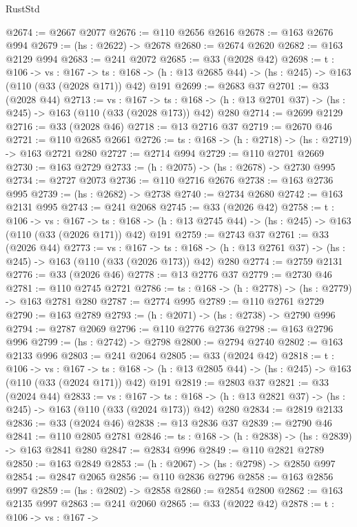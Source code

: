 \begin{lexlean}{RustStd}
\begin{coremodule}
@2674 := @2667 @2077
@2676 := @110 @2656 @2616
@2678 := @163 @2676 @994
@2679 := (hs : @2622) -> @2678
@2680 := @2674 @2620
@2682 := @163 @2129 @994
@2683 := @241 @2072
@2685 := @33 (@2028 @42)
@2698 := {t : @106} ->
  {vs : @167} ->
  {ts : @168} -> (h : @13 @2685 @44) -> (hs : @245) -> @163 (@110 (@33 (@2028 @171)) @42) @191
@2699 := @2683 @37
@2701 := @33 (@2028 @44)
@2713 := {vs : @167} ->
  {ts : @168} -> (h : @13 @2701 @37) -> (hs : @245) -> @163 (@110 (@33 (@2028 @173)) @42) @280
@2714 := @2699 @2129
@2716 := @33 (@2028 @46)
@2718 := @13 @2716 @37
@2719 := @2670 @46
@2721 := @110 @2685 @2661
@2726 := {ts : @168} -> (h : @2718) -> (hs : @2719) -> @163 @2721 @280
@2727 := @2714 @994
@2729 := @110 @2701 @2669
@2730 := @163 @2729
@2733 := (h : @2075) -> (hs : @2678) -> @2730 @995
@2734 := @2727 @2073
@2736 := @110 @2716 @2676
@2738 := @163 @2736 @995
@2739 := (hs : @2682) -> @2738
@2740 := @2734 @2680
@2742 := @163 @2131 @995
@2743 := @241 @2068
@2745 := @33 (@2026 @42)
@2758 := {t : @106} ->
  {vs : @167} ->
  {ts : @168} -> (h : @13 @2745 @44) -> (hs : @245) -> @163 (@110 (@33 (@2026 @171)) @42) @191
@2759 := @2743 @37
@2761 := @33 (@2026 @44)
@2773 := {vs : @167} ->
  {ts : @168} -> (h : @13 @2761 @37) -> (hs : @245) -> @163 (@110 (@33 (@2026 @173)) @42) @280
@2774 := @2759 @2131
@2776 := @33 (@2026 @46)
@2778 := @13 @2776 @37
@2779 := @2730 @46
@2781 := @110 @2745 @2721
@2786 := {ts : @168} -> (h : @2778) -> (hs : @2779) -> @163 @2781 @280
@2787 := @2774 @995
@2789 := @110 @2761 @2729
@2790 := @163 @2789
@2793 := (h : @2071) -> (hs : @2738) -> @2790 @996
@2794 := @2787 @2069
@2796 := @110 @2776 @2736
@2798 := @163 @2796 @996
@2799 := (hs : @2742) -> @2798
@2800 := @2794 @2740
@2802 := @163 @2133 @996
@2803 := @241 @2064
@2805 := @33 (@2024 @42)
@2818 := {t : @106} ->
  {vs : @167} ->
  {ts : @168} -> (h : @13 @2805 @44) -> (hs : @245) -> @163 (@110 (@33 (@2024 @171)) @42) @191
@2819 := @2803 @37
@2821 := @33 (@2024 @44)
@2833 := {vs : @167} ->
  {ts : @168} -> (h : @13 @2821 @37) -> (hs : @245) -> @163 (@110 (@33 (@2024 @173)) @42) @280
@2834 := @2819 @2133
@2836 := @33 (@2024 @46)
@2838 := @13 @2836 @37
@2839 := @2790 @46
@2841 := @110 @2805 @2781
@2846 := {ts : @168} -> (h : @2838) -> (hs : @2839) -> @163 @2841 @280
@2847 := @2834 @996
@2849 := @110 @2821 @2789
@2850 := @163 @2849
@2853 := (h : @2067) -> (hs : @2798) -> @2850 @997
@2854 := @2847 @2065
@2856 := @110 @2836 @2796
@2858 := @163 @2856 @997
@2859 := (hs : @2802) -> @2858
@2860 := @2854 @2800
@2862 := @163 @2135 @997
@2863 := @241 @2060
@2865 := @33 (@2022 @42)
@2878 := {t : @106} ->
  {vs : @167} ->

\end{coremodule}
\end{lexlean}
